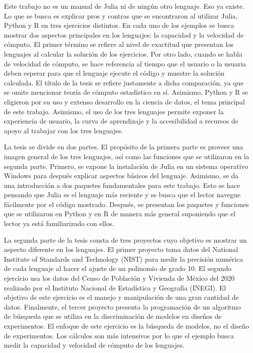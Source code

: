Este trabajo no es un manual de \textsf{Julia} ni de ningún otro lenguaje. Eso ya existe. Lo que se busca es explicar pros y contras que se encontraron al utilizar \textsf{Julia}, \textsf{Python} y \textsf{R} en tres ejercicios distintos. En cada uno de los ejemplos se busca mostrar dos aspectos principales en los lenguajes: la capacidad y la velocidad de cómputo. El primer término se refiere al nivel de exactitud que presentan los lenguajes al calcular la solución de los ejercicios. Por otro lado, cuando se habla de velocidad de cómputo, se hace referencia al tiempo que el usuario o la usuaria deben esperar para que el lenguaje ejecute el código y muestre la solución calculada. El título de la tesis se refiere justamente a dicha comparación, ya que se omite mencionar teoría de cómputo estadístico en sí. Asimismo, \textsf{Python} y \textsf{R} se eligieron por su uso y extenso desarrollo en la ciencia de datos, el tema principal de este trabajo. Asimismo, el uso de los tres lenguajes permite exponer la experiencia de usuario, la curva de aprendizaje y la accesibilidad a recursos de apoyo al trabajar con los tres lenguajes. 

La tesis se divide en dos partes. El propósito de la primera parte es proveer una imagen general de los tres lenguajes, así como las funciones que se utilizaron en la segunda parte. Primero, se expone la instalación de \textsf{Julia} en un sistema operativo \textsf{Windows} para después explicar aspectos básicos del lenguaje. Asimismo, se da una introducción a dos paquetes fundamentales para este trabajo. Esto se hace pensando que \textsf{Julia} es el lenguaje más reciente y se busca que el lector navegue fácilmente por el código mostrado. Después, se presentan los paquetes y funciones que se utilizaron en \textsf{Python} y en \textsf{R} de manera más general suponiendo que el lector ya está familiarizado con ellos. 

La segunda parte de la tesis consta de tres proyectos cuyo objetivo es mostrar un aspecto diferente en los lenguajes. El primer proyecto toma datos del National Institute of Standards and Technology (NIST) para medir la precisión numérica de cada lenguaje al hacer el ajuste de un polinomio de grado 10. El segundo ejercicio usa los datos del Censo de Población y Vivienda de México del 2020 realizado por el Instituto Nacional de Estadística y Geografía (INEGI). El objetivo de este ejercicio es el manejo y manipulación de una gran cantidad de datos. Finalmente, el tercer proyecto presenta la programación de un algoritmo de búsqueda que se utiliza en la discriminación de modelos en diseños de experimentos. El enfoque de este ejercicio es la búsqueda de modelos, no el diseño de experimentos. Los cálculos son más intensivos por lo que el ejemplo busca medir la capacidad y velocidad de cómputo de los lenguajes. 

